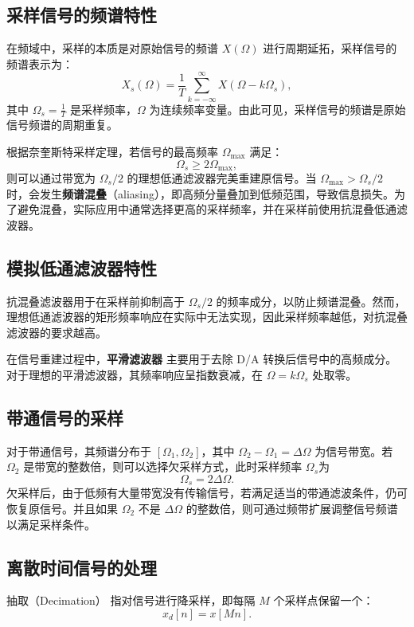 \subsection{采样信号的频谱特性}
在频域中，采样的本质是对原始信号的频谱 $X(\Omega)$ 进行周期延拓，采样信号的频谱表示为：
\begin{equation}
    X_s(\Omega) = \frac{1}{T} \sum_{k=-\infty}^{\infty} X\left(\Omega - k\Omega_s\right),
\end{equation}
其中 $\Omega_s = \frac{1}{T}$ 是采样频率，$\Omega$ 为连续频率变量。由此可见，采样信号的频谱是原始信号频谱的周期重复。

根据奈奎斯特采样定理，若信号的最高频率 $\Omega_{\max}$ 满足：
\begin{equation}
    \Omega_s \geq 2\Omega_{\max},
\end{equation}
则可以通过带宽为 $\Omega_s/2$ 的理想低通滤波器完美重建原信号。当 $\Omega_{\max} > \Omega_s/2$ 时，会发生\textbf{频谱混叠}（aliasing），即高频分量叠加到低频范围，导致信息损失。为了避免混叠，实际应用中通常选择更高的采样频率，并在采样前使用抗混叠低通滤波器。


\subsection{模拟低通滤波器特性}
抗混叠滤波器用于在采样前抑制高于 $\Omega_s/2$ 的频率成分，以防止频谱混叠。然而，理想低通滤波器的矩形频率响应在实际中无法实现，因此采样频率越低，对抗混叠滤波器的要求越高。

在信号重建过程中，\textbf{平滑滤波器} 主要用于去除 D/A 转换后信号中的高频成分。对于理想的平滑滤波器，其频率响应呈指数衰减，在 $\Omega = k\Omega_s$ 处取零。

\subsection{带通信号的采样}
对于带通信号，其频谱分布于 $\left[\Omega_1, \Omega_2\right]$，其中 $\Omega_2 - \Omega_1 = \Delta\Omega$ 为信号带宽。若 $\Omega_2$ 是带宽的整数倍，则可以选择欠采样方式，此时采样频率 $\Omega_s$为
\begin{equation}
    \Omega_s = 2\Delta\Omega.
\end{equation}
欠采样后，由于低频有大量带宽没有传输信号，若满足适当的带通滤波条件，仍可恢复原信号。并且如果 $\Omega_2$ 不是 $\Delta\Omega$ 的整数倍，则可通过频带扩展调整信号频谱以满足采样条件。

\subsection{离散时间信号的处理}
\begin{definition}[离散时间信号的抽取]
  抽取（Decimation） 指对信号进行降采样，即每隔 $M$ 个采样点保留一个：
\begin{equation}
    x_d[n] = x[Mn].
\end{equation}
\end{definition}

